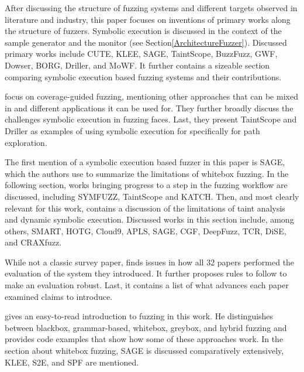 \documentclass{article}
\begin{document}
\begin{multicols}{2}
    After discussing the structure of fuzzing systems and different targets observed in literature and industry, this paper focuses on inventions of primary works along the structure of fuzzers. Symbolic execution is discussed in the context of the sample generator and the monitor (see Section\ref{ArchitectureFuzzer}). Discussed primary works include CUTE\cite{CUTE}, KLEE\cite{KLEE}, SAGE\cite{SAGE}, TaintScope\cite{TaintScope}, BuzzFuzz\cite{BuzzFuzz}, GWF\cite{GWF}, Dowser\cite{Dowser}, BORG\cite{BORG}, Driller\cite{Driller}, and MoWF\cite{MoWF}. It further contains a sizeable section comparing symbolic execution based fuzzing systems and their contributions.

    \citeauthor{FuzzingASurvey} focus on coverage-guided fuzzing, mentioning other approaches that can be mixed in and different applications it can be used for. They further broadly discuss the challenges symbolic execution in fuzzing faces. Last, they present TaintScope\cite{TaintScope} and Driller\cite{Driller} as examples of using symbolic execution for specifically for path exploration.

    The first mention of a symbolic execution based fuzzer in this paper is SAGE\cite{SAGE}, which the authors use to summarize the limitations of whitebox fuzzing. In the following section, works bringing progress to a step in the fuzzing workflow are discussed, including SYMFUZZ\cite{SYMFUZZ}, TaintScope\cite{TaintScope} and KATCH\cite{KATCH}. Then, and most clearly relevant for this work,  contains a discussion of the limitations of taint analysis and dynamic symbolic execution. Discussed works in this section include, among others,  SMART\cite{SMART}, HOTG\cite{HigherOrderTestGeneration}, Cloud9\cite{Cloud9}, APLS\cite{APLS}, SAGE\cite{SAGE}, CGF\cite{CGF}, DeepFuzz\cite{DeepFuzz}, TCR\cite{TCR}, DiSE\cite{DiSE}, and CRAXfuzz\cite{CRAXfuzz}.

    While not a classic survey paper,  finds issues in how all 32 papers performed the evaluation of the system they introduced. It further proposes rules to follow to make an evaluation robust. Last, it contains a list of what advances each paper examined claims to introduce.

    \citeauthor{HackArtScience} gives an easy-to-read introduction to fuzzing in this work. He distinguishes between blackbox, grammar-based, whitebox, greybox, and hybrid fuzzing and provides code examples that show how some of these approaches work. In the section about whitebox fuzzing, SAGE\cite{SAGE} is discussed comparatively extensively, KLEE\cite{KLEE}, S2E\cite{S2E}, and SPF\cite{SPF} are mentioned.


\end{multicols}
\end{document}
